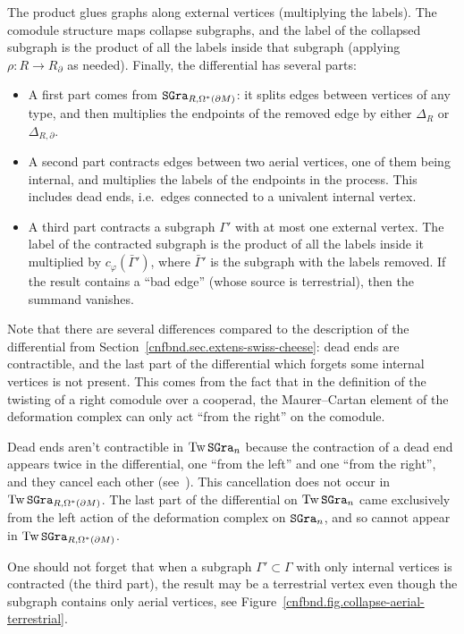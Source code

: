 The product glues graphs along external vertices (multiplying the labels).
The comodule structure maps collapse subgraphs, and the label of the collapsed subgraph is the product of all the labels inside that subgraph (applying $\rho : R \to R_{\partial}$ as needed).
Finally, the differential has several parts:
\begin{itemize}
\item A first part comes from $\mathtt{SGra}_{R, \Omega^{*}(\partial M)}$: it splits edges between vertices of any type, and then multiplies the endpoints of the removed edge by either $\Delta_{R}$ or $\Delta_{R,\partial}$.
\item A second part contracts edges between two aerial vertices, one of them being internal, and multiplies the labels of the endpoints in the process.
  This includes dead ends, i.e.\ edges connected to a univalent internal vertex.
\item A third part contracts a subgraph $\Gamma'$ with at most one external vertex.
  The label of the contracted subgraph is the product of all the labels inside it multiplied by $c_{\varphi}(\bar{\Gamma}')$, where $\bar{\Gamma}'$ is the subgraph with the labels removed.
  If the result contains a ``bad edge'' (whose source is terrestrial), then the summand vanishes.
\end{itemize}

\begin{remark}
  Note that there are several differences compared to the description of the differential from Section~\ref{cnfbnd.sec.extens-swiss-cheese}: dead ends are contractible, and the last part of the differential which forgets some internal vertices is not present.
  This comes from the fact that in the definition of the twisting of a right comodule over a cooperad, the Maurer--Cartan element of the deformation complex can only act ``from the right'' on the comodule.

  Dead ends aren't contractible in $\operatorname{Tw} \mathtt{SGra}_{n}$  because the contraction of a dead end appears twice in the differential, one ``from the left'' and one ``from the right'', and they cancel each other (see~\cite[Appendix~I.3]{Willwacher2014}).
  This cancellation does not occur in $\operatorname{Tw} \mathtt{SGra}_{R, \Omega^{*}(\partial M)}$.
  The last part of the differential on $\operatorname{Tw} \mathtt{SGra}_{n}$ came exclusively from the left action of the deformation complex on $\mathtt{SGra}_{n}$, and so cannot appear in $\operatorname{Tw} \mathtt{SGra}_{R, \Omega^{*}(\partial M)}$.
\end{remark}

\begin{remark}
  \label{cnfbnd.rmk.stokes}
  One should not forget that when a subgraph $\Gamma' \subset \Gamma$ with only internal vertices is contracted (the third part), the result may be a terrestrial vertex even though the subgraph contains only aerial vertices, see Figure~\ref{cnfbnd.fig.collapse-aerial-terrestrial}.
\end{remark}

